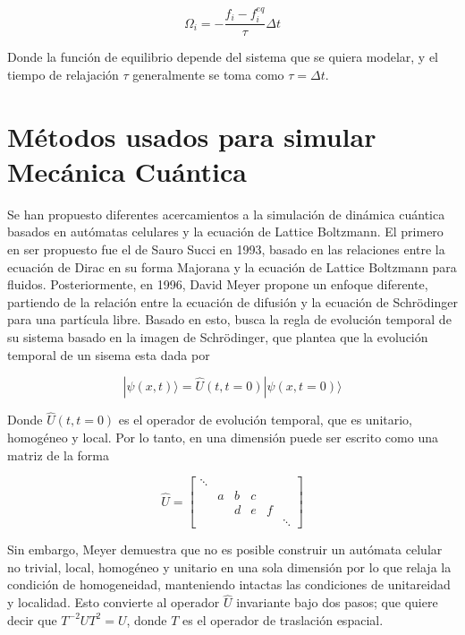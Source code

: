 \documentclass[12pts, letterpaper]{article}
\begin{document}
\begin{equation*}
    \Omega_i = -\frac{f_i-f_i^{eq}}{\tau}\Delta t
\end{equation*}

Donde la función de equilibrio depende del sistema que se quiera modelar, y el tiempo de 
relajación $\tau$ generalmente se toma como $\tau=\Delta t$.

\section{Métodos usados para simular Mecánica Cuántica}
Se han propuesto diferentes acercamientos a la simulación de dinámica cuántica basados en 
autómatas celulares y la ecuación de Lattice Boltzmann. El primero en ser propuesto fue el 
de Sauro Succi en 1993, basado en las relaciones entre la ecuación de Dirac en su forma 
Majorana y la ecuación de Lattice Boltzmann para fluidos. Posteriormente, en 1996, David 
Meyer propone un enfoque diferente, partiendo de la relación entre la ecuación de difusión 
y la ecuación de Schrödinger para una partícula libre. Basado en esto, busca la regla de 
evolución temporal de su sistema basado en la imagen de Schrödinger, que plantea que la 
evolución temporal de un sisema esta dada por

\begin{equation}\label{eq:sch_im}
    |\psi(x,t)\rangle = \hat{U}(t, t=0)|\psi(x, t=0)\rangle
\end{equation}

Donde $\hat{U}(t, t=0)$ es el operador de evolución temporal, que es unitario, homogéneo y 
local. Por lo tanto, en una dimensión puede ser escrito como una matriz de la forma

\begin{equation*}
    \hat{U} = 
    \begin{bmatrix}
        \ddots & \\
        & a & b & c \\
        & & d & e & f \\
        & & & & & \ddots 
    \end{bmatrix}
\end{equation*}

Sin embargo, Meyer demuestra que no es posible construir un autómata celular no trivial, 
local, homogéneo y unitario en una sola dimensión \cite{meyer}por lo que relaja la 
condición de homogeneidad, manteniendo intactas las condiciones de unitareidad y localidad.
Esto convierte al operador $\hat{U}$ invariante bajo dos pasos; que quiere decir que 
$T^{-2}UT^2=U$, donde $T$ es el operador de traslación espacial.
\end{document}
